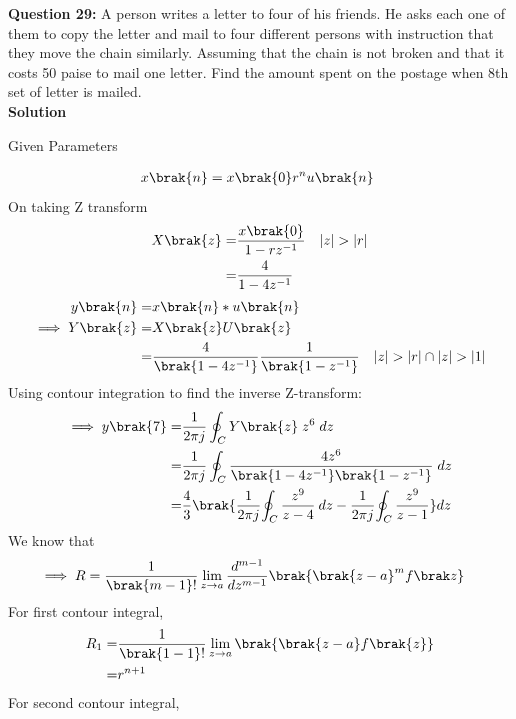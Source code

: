 \documentclass[journal,12pt,twocolumn]{IEEEtran}
\theoremstyle{remark}
\begin{document}
\textbf{Question 29: }A person writes a letter to four of his friends. He asks each one of them to copy the letter and mail to four different persons with instruction that they move the chain similarly. Assuming that the chain is not broken and that it costs 50 paise to mail one letter. Find the amount spent on the postage when 8th set of letter is mailed.\\

\textbf{Solution}
\fi
\begin{table}[!h]
	\centering
	
	\vspace{6 pt}
	\caption{Given Parameters}
	\label{tab: 11.9.5.29.1}
\end{table}
\begin{align}
x\brak{n}=x\brak{0}r^nu\brak{n}\
\end{align}
On taking Z transform
\begin{align}
X\brak{z}=&\dfrac{x\brak{0}}{1-rz^{-1}}  \quad |z|>|r|\\
 		 =&\dfrac{4}{1-4z^{-1}}
\end{align}
\begin{align}
y\brak{n} =& x\brak{n}* u\brak{n}\\
\implies Y\brak{z} =& X\brak{z} U\brak{z}\\
                   =& \dfrac{4}{\brak{1-4z^{-1}}}\dfrac{1}{\brak{1-z^{-1}}} \quad |z|>|r| \cap |z|>|1|    
\end{align}
Using contour integration to find the inverse Z-transform:\\
\begin{align}
    \implies y\brak{7}=&\dfrac{1}{2\pi j}\oint_{C}Y\brak{z} \;z^{6} \;dz\\
    =&\dfrac{1}{2\pi j}\oint_{C}\dfrac{4z^6}{\brak{1-4z^{-1}}\brak{1-z^{-1}}}\;dz \\
    =&\dfrac{4}{3} \brak{\frac{1}{2\pi j} {\oint_C \dfrac{z^{9}}{z - 4} \:dz -  \frac{1}{2\pi j}{\oint_C \frac{z^{9}}{z - 1}}}} dz
\end{align}
We know that 
\begin{align}
    \implies R&=\dfrac{1}{\brak {m-1}!}\lim\limits_{z\to a}\dfrac{d^{m-1}}{dz^{m-1}}\brak {{\brak{z-a}}^{m}f\brak z}  
\end{align}
For first contour integral,
\begin{align}
R_1 =& \frac{1}{\brak{1 - 1}!} \lim_{z \to a} \brak{\brak{z - a}f\brak{z}}\\
	=& r^{n+1}
\end{align}
For second contour integral,
\end{document}
